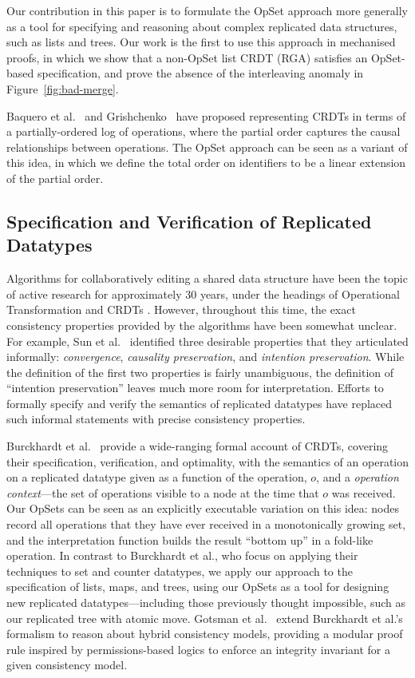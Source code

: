 Our contribution in this paper is to formulate the OpSet approach more generally as a tool for specifying and reasoning about complex replicated data structures, such as lists and trees.
Our work is the first to use this approach in mechanised proofs, in which we show that a non-OpSet list CRDT (RGA) satisfies an OpSet-based specification, and prove the absence of the interleaving anomaly in Figure~\ref{fig:bad-merge}.

Baquero et al.~\cite{Baquero:2014ed} and Grishchenko~\cite{Grishchenko:2014eh} have proposed representing CRDTs in terms of a partially-ordered log of operations, where the partial order captures the causal relationships between operations.
The OpSet approach can be seen as a variant of this idea, in which we define the total order on identifiers to be a linear extension of the partial order.

\subsection{Specification and Verification of Replicated Datatypes}

Algorithms for collaboratively editing a shared data structure have been the topic of active research for approximately 30 years, under the headings of Operational Transformation \cite{Ellis:1989ue,Ressel:1996wx,Sun:1998vf,Oster:2006tr} and CRDTs \cite{Shapiro:2011wy,Shapiro:2011un}.
However, throughout this time, the exact consistency properties provided by the algorithms have been somewhat unclear.
For example, Sun et al.~\cite{Sun:1998un} identified three desirable properties that they articulated informally: \emph{convergence}, \emph{causality preservation}, and \emph{intention preservation}.
While the definition of the first two properties is fairly unambiguous, the definition of ``intention preservation'' leaves much more room for interpretation.
Efforts to formally specify and verify the semantics of replicated datatypes have replaced such informal statements with precise consistency properties.

Burckhardt et al.~\cite{Burckhardt:2014ft} provide a wide-ranging formal account of CRDTs, covering their specification, verification, and optimality, with the semantics of an operation on a replicated datatype given as a function of the operation, $o$, and a \emph{operation context}---the set of operations visible to a node at the time that $o$ was received.
Our OpSets can be seen as an explicitly executable variation on this idea: nodes record all operations that they have ever received in a monotonically growing set, and the interpretation function builds the result ``bottom up'' in a fold-like operation.
In contrast to Burckhardt et al., who focus on applying their techniques to set and counter datatypes, we apply our approach to the specification of lists, maps, and trees, using our OpSets as a tool for designing new replicated datatypes---including those previously thought impossible, such as our replicated tree with atomic move.
Gotsman et al.~\cite{DBLP:conf/popl/GotsmanYFNS16} extend Burckhardt et al.'s formalism to reason about hybrid consistency models, providing a modular proof rule inspired by permissions-based logics to enforce an integrity invariant for a given consistency model.

